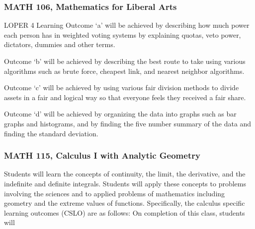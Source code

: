 \documentclass[11pt]{article}
\begin{document}
\subsubsection{MATH 106, Mathematics for Liberal Arts} 
LOPER 4 Learning Outcome `a' will be achieved by describing how 
much power each person has in weighted voting systems by explaining 
quotas, veto power, dictators, dummies and other terms. 

Outcome `b' will be achieved by describing the best route to take 
using various algorithms such as brute force, cheapest link, and 
nearest neighbor algorithms. 

Outcome `c' will be achieved by using various fair division methods 
to divide assets in a fair and logical way so that everyone feels 
they received a fair share. 

Outcome `d' will be achieved by organizing the data into graphs such 
as bar graphs and histograms, and by finding the five number summary 
of the data and finding the standard deviation. 


\subsubsection{MATH 115, Calculus I with Analytic Geometry} 

Students will learn the concepts of continuity, 
the limit, the derivative, and the indefinite and definite integrals. 
Students will apply these concepts to problems involving the sciences 
and to applied problems of mathematics including geometry and the 
extreme values of functions. Specifically, the calculus specific learning outcomes 
(CSLO) are as follows: On completion of this class, students will
\end{document}
